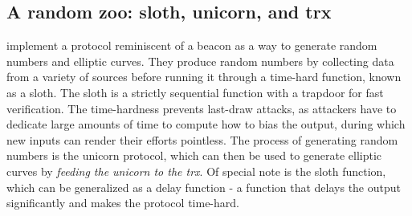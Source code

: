\subsection{A random zoo: sloth, unicorn, and trx}
\label{sub:random_zoo}
\citet{randomzoo} implement a protocol reminiscent of a beacon as a way to generate random numbers and elliptic curves. They produce random numbers by collecting data from a variety of sources before running it through a time-hard function, known as a sloth. The sloth is a strictly sequential function with a trapdoor for fast verification. The time-hardness prevents last-draw attacks, as attackers have to dedicate large amounts of time to compute how to bias the output, during which new inputs can render their efforts pointless. The process of generating random numbers is the unicorn protocol, which can then be used to generate elliptic curves by  \textit{feeding the unicorn to the trx}. 
Of special note is the sloth function, which can be generalized as a delay function - a function that delays the output significantly and makes the protocol time-hard. 